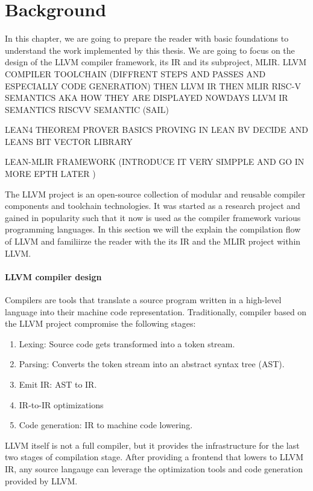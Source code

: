 \chapter{Background}
In this chapter, we are going to prepare the reader with basic foundations to understand the work implemented by this thesis.
We are going to focus on the design of the LLVM compiler framework, its IR and its subproject, MLIR.
LLVM COMPILER TOOLCHAIN
(DIFFRENT STEPS AND PASSES AND ESPECIALLY CODE GENERATION)
THEN LLVM IR
THEN MLIR 
RISC-V
SEMANTICS AKA HOW THEY ARE DISPLAYED NOWDAYS
    LLVM IR SEMANTICS 
    RISCVV SEMANTIC (SAIL)

LEAN4 THEOREM PROVER 
    BASICS
    PROVING IN LEAN
    BV DECIDE AND LEANS BIT VECTOR LIBRARY

LEAN-MLIR FRAMEWORK (INTRODUCE IT VERY SIMPPLE AND GO IN MORE EPTH LATER )

The LLVM project is an open-source collection of modular and reusable compiler components and toolchain technologies. It was started as a research project and gained in popularity such that it now is used as the compiler framework various programming languages. In this section we will the explain the compilation flow of LLVM and familiirze the reader with the its IR and the MLIR project within LLVM.

\subsubsection{LLVM compiler design}
Compilers are tools that translate a source program written in a high-level language into their machine code representation. Traditionally, compiler based on the LLVM project compromise the following stages:
\begin{enumerate}
  \item Lexing: Source code gets transformed into a token stream.
  \item Parsing: Converts the token stream into an abstract syntax tree (AST).
  \item Emit IR: AST to IR.
  \item IR-to-IR optimizations
  \item Code generation: IR to machine code lowering.
\end{enumerate}
LLVM itself is not a full compiler, but it provides the infrastructure for the last two stages of compilation stage. After providing a frontend that lowers to LLVM IR, any source langauge can leverage the optimization tools and code generation provided by LLVM. 

